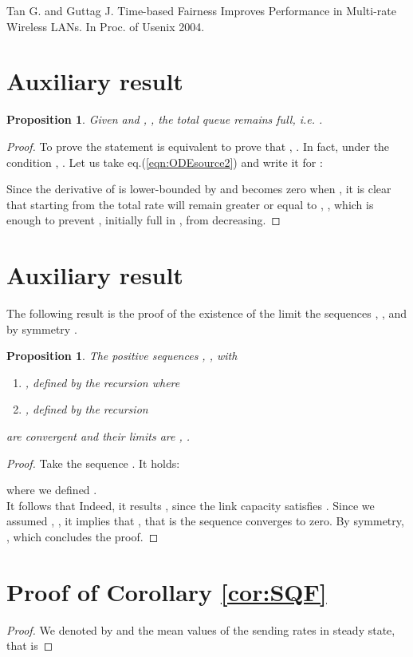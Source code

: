 \documentclass[a4paper,oneside, 11pt]{article}
\newtheorem{prop}[theorem]{Proposition}
\begin{document}
Tan G. and Guttag J.
Time-based Fairness Improves Performance in Multi-rate Wireless LANs.
In Proc. of Usenix 2004.
\begin{appendix}
\section{Auxiliary result }\label{app:1}
\begin{prop}Given  and , , the total queue remains full, i.e. .
\end{prop}
\begin{proof}
To prove the statement is equivalent to prove that , .
In fact, under the condition , .
Let us take eq.(\ref{eqn:ODEsource2}) and write it for :

Since the derivative of  is lower-bounded by  and becomes zero when ,  it is clear that starting from  the total rate will remain
greater or equal to , , which is enough to prevent , initially full in , from decreasing.
\end{proof}
\section{Auxiliary result }\label{app:2}
The following result is the proof of the existence of the limit
the sequences , ,  and by symmetry .\begin{prop}The positive sequences  ,  , with
\begin{enumerate}
 \item ,  defined by the recursion
where

\item ,  defined by the recursion

\end{enumerate}
are convergent and their limits are , .
\end{prop}
\begin{proof}
Take the sequence . It holds:

where we defined  .\\
It follows that Indeed, it results , since the link capacity satisfies .
Since we assumed , , it implies that , that is the sequence converges to zero.
By symmetry, , which concludes the proof.
\end{proof}
\section{Proof of Corollary \ref{cor:SQF}}\label{app:3}
\begin{proof}
We denoted by  and  the mean values of the sending rates in steady state, that is


\end{proof}
\end{appendix}
\end{document}
